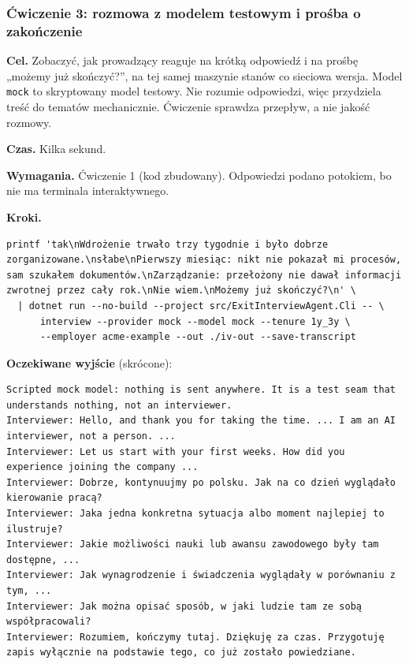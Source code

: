 {\subsubsection{Ćwiczenie 3: rozmowa z modelem testowym i prośba o zakończenie}

\textbf{Cel.} Zobaczyć, jak prowadzący reaguje na krótką odpowiedź i na prośbę
„możemy już skończyć?”, na tej samej maszynie stanów co sieciowa wersja. Model
\texttt{mock} to skryptowany model testowy. Nie rozumie odpowiedzi, więc
przydziela treść do tematów mechanicznie. Ćwiczenie sprawdza przepływ, a nie
jakość rozmowy.

\textbf{Czas.} Kilka sekund.

\textbf{Wymagania.} Ćwiczenie 1 (kod zbudowany). Odpowiedzi podano potokiem,
bo nie ma terminala interaktywnego.

\textbf{Kroki.}

\begin{Verbatim}[fontsize=\scriptsize,frame=single,framesep=2mm]
printf 'tak\nWdrożenie trwało trzy tygodnie i było dobrze zorganizowane.\nsłabe\nPierwszy miesiąc: nikt nie pokazał mi procesów, sam szukałem dokumentów.\nZarządzanie: przełożony nie dawał informacji zwrotnej przez cały rok.\nNie wiem.\nMożemy już skończyć?\n' \
  | dotnet run --no-build --project src/ExitInterviewAgent.Cli -- \
      interview --provider mock --model mock --tenure 1y_3y \
      --employer acme-example --out ./iv-out --save-transcript
\end{Verbatim}

\textbf{Oczekiwane wyjście} (skrócone):

\begin{Verbatim}[fontsize=\scriptsize,frame=single,framesep=2mm]
Scripted mock model: nothing is sent anywhere. It is a test seam that understands nothing, not an interviewer.
Interviewer: Hello, and thank you for taking the time. ... I am an AI interviewer, not a person. ...
Interviewer: Let us start with your first weeks. How did you experience joining the company ...
Interviewer: Dobrze, kontynuujmy po polsku. Jak na co dzień wyglądało kierowanie pracą?
Interviewer: Jaka jedna konkretna sytuacja albo moment najlepiej to ilustruje?
Interviewer: Jakie możliwości nauki lub awansu zawodowego były tam dostępne, ...
Interviewer: Jak wynagrodzenie i świadczenia wyglądały w porównaniu z tym, ...
Interviewer: Jak można opisać sposób, w jaki ludzie tam ze sobą współpracowali?
Interviewer: Rozumiem, kończymy tutaj. Dziękuję za czas. Przygotuję zapis wyłącznie na podstawie tego, co już zostało powiedziane.


\end{Verbatim}}
